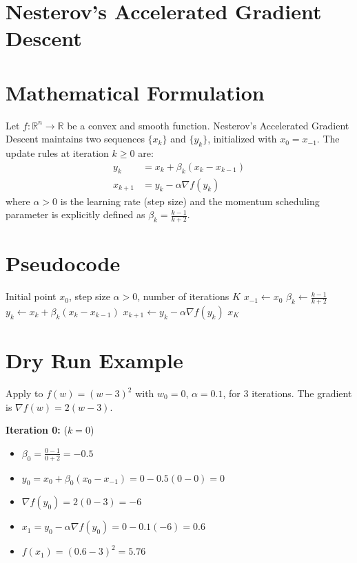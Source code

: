 \documentclass{article}
\begin{document}
\section*{Nesterov's Accelerated Gradient Descent}

\section*{Mathematical Formulation}
Let $f: \mathbb{R}^n \to \mathbb{R}$ be a convex and smooth function. Nesterov's Accelerated Gradient Descent maintains two sequences $\{x_k\}$ and $\{y_k\}$, initialized with $x_0 = x_{-1}$. The update rules at iteration $k \geq 0$ are:
\begin{align*}
y_k &= x_k + \beta_k (x_k - x_{k-1}) \\
x_{k+1} &= y_k - \alpha \nabla f(y_k)
\end{align*}
where $\alpha > 0$ is the learning rate (step size) and the momentum scheduling parameter is explicitly defined as $\beta_k = \frac{k-1}{k+2}$.

\section*{Pseudocode}
\begin{algorithm}[H]
\caption{Nesterov's Accelerated Gradient Descent}
\begin{algorithmic}[1]
\REQUIRE Initial point $x_0$, step size $\alpha > 0$, number of iterations $K$
\STATE $x_{-1} \leftarrow x_0$
\STATE $\beta_k \leftarrow \frac{k-1}{k+2}$
\STATE $y_k \leftarrow x_k + \beta_k (x_k - x_{k-1})$
\STATE $x_{k+1} \leftarrow y_k - \alpha \nabla f(y_k)$
\ENDFOR
\ENSURE $x_K$
\end{algorithmic}
\end{algorithm}

\section*{Dry Run Example}
Apply to $f(w) = (w-3)^2$ with $w_0 = 0$, $\alpha = 0.1$, for 3 iterations.
The gradient is $\nabla f(w) = 2(w-3)$.

\textbf{Iteration 0:} ($k=0$)
\begin{itemize}
\item $\beta_0 = \frac{0-1}{0+2} = -0.5$
\item $y_0 = x_0 + \beta_0(x_0 - x_{-1}) = 0 - 0.5(0 - 0) = 0$
\item $\nabla f(y_0) = 2(0 - 3) = -6$
\item $x_1 = y_0 - \alpha \nabla f(y_0) = 0 - 0.1(-6) = 0.6$
\item $f(x_1) = (0.6 - 3)^2 = 5.76$
\end{itemize}
\end{document}

